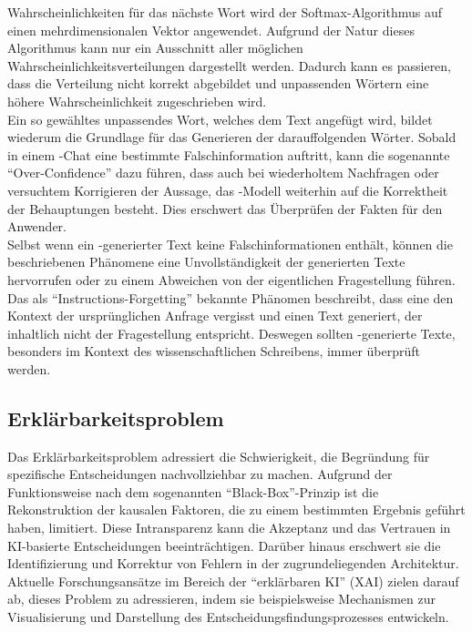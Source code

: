 \documentclass[../main.tex]{subfiles}
\begin{document}
Wahrscheinlichkeiten für das nächste Wort wird der Softmax-Algorithmus auf einen mehrdimensionalen Vektor angewendet. Aufgrund der Natur dieses Algorithmus kann nur 
ein Ausschnitt aller möglichen Wahrscheinlichkeitsverteilungen dargestellt werden. Dadurch kann es passieren, dass die Verteilung nicht korrekt abgebildet und 
unpassenden Wörtern eine höhere Wahrscheinlichkeit zugeschrieben wird.\cite{softmax} \\
Ein so gewähltes unpassendes Wort, welches dem Text angefügt wird, bildet wiederum die Grundlage für das Generieren der darauffolgenden Wörter. Sobald in einem -Chat eine 
bestimmte Falschinformation auftritt, kann die sogenannte "`Over-Confidence"' dazu führen, dass auch bei wiederholtem Nachfragen oder versuchtem Korrigieren der 
Aussage, das -Modell weiterhin auf die Korrektheit der Behauptungen besteht. Dies erschwert das Überprüfen der Fakten für den Anwender.\cite{allgemHalluzinationen,softmax} \\
Selbst wenn ein -generierter Text keine Falschinformationen enthält, können die beschriebenen Phänomene eine Unvollständigkeit der generierten Texte hervorrufen 
oder zu einem Abweichen von der eigentlichen Fragestellung führen.  Das als "`Instructions-Forgetting"' bekannte Phänomen beschreibt, dass eine  den Kontext der 
ursprünglichen Anfrage vergisst und einen Text generiert, der inhaltlich nicht der Fragestellung entspricht. Deswegen sollten -generierte Texte, besonders im Kontext 
des wissenschaftlichen Schreibens, immer überprüft werden.\cite{allgemHalluzinationen}


\subsection{Erklärbarkeitsproblem}

Das Erklärbarkeitsproblem adressiert die Schwierigkeit, die Begründung für spezifische Entscheidungen  nachvollziehbar zu machen. Aufgrund der Funktionsweise nach dem sogenannten 
"`Black-Box"'-Prinzip ist die Rekonstruktion der kausalen Faktoren, die zu einem bestimmten Ergebnis geführt haben, limitiert. Diese Intransparenz kann die Akzeptanz und das Vertrauen in 
KI-basierte Entscheidungen beeinträchtigen. Darüber hinaus erschwert sie die Identifizierung und Korrektur von Fehlern in der zugrundeliegenden Architektur. Aktuelle Forschungsansätze 
im Bereich der "`erklärbaren KI"' (XAI) zielen darauf ab, dieses Problem zu adressieren, indem sie beispielsweise Mechanismen zur Visualisierung und Darstellung des 
Entscheidungsfindungsprozesses entwickeln.
 
\end{document}
